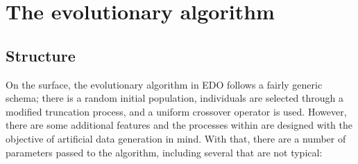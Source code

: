 \section{The evolutionary algorithm}\label{section:algorithm}

\subsection{Structure}

On the surface, the evolutionary algorithm in EDO follows a fairly generic
schema; there is a random initial population, individuals are selected through a
modified truncation process, and a uniform crossover operator is used. However,
there are some additional features and the processes within are designed with
the objective of artificial data generation in mind. With that, there are a
number of parameters passed to the algorithm, including several that are not
typical:

